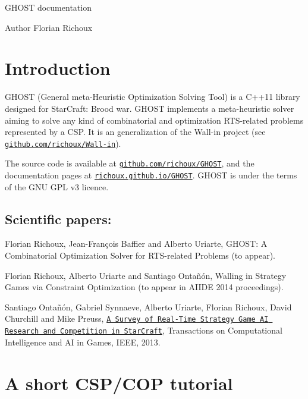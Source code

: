 G\-H\-O\-S\-T documentation \begin{DoxyAuthor}{Author}
Florian Richoux
\end{DoxyAuthor}
\section*{Introduction }

G\-H\-O\-S\-T (General meta-\/\-Heuristic Optimization Solving Tool) is a C++11 library designed for Star\-Craft\-: Brood war. G\-H\-O\-S\-T implements a meta-\/heuristic solver aiming to solve any kind of combinatorial and optimization R\-T\-S-\/related problems represented by a C\-S\-P. It is an generalization of the Wall-\/in project (see \href{https://github.com/richoux/Wall-in}{\tt github.\-com/richoux/\-Wall-\/in}).

The source code is available at \href{https://github.com/richoux/GHOST}{\tt github.\-com/richoux/\-G\-H\-O\-S\-T}, and the documentation pages at \href{http://richoux.github.io/GHOST}{\tt richoux.\-github.\-io/\-G\-H\-O\-S\-T}. G\-H\-O\-S\-T is under the terms of the G\-N\-U G\-P\-L v3 licence.

\subsection*{Scientific papers\-: }


\begin{DoxyItemize}
\item Florian Richoux, Jean-\/\-François Baffier and Alberto Uriarte, G\-H\-O\-S\-T\-: A Combinatorial Optimization Solver for R\-T\-S-\/related Problems (to appear).
\item Florian Richoux, Alberto Uriarte and Santiago Ontañón, Walling in Strategy Games via Constraint Optimization (to appear in A\-I\-I\-D\-E 2014 proceedings).
\item Santiago Ontañón, Gabriel Synnaeve, Alberto Uriarte, Florian Richoux, David Churchill and Mike Preuss, \href{http://pagesperso.lina.univ-nantes.fr/~richoux-f/publications/tciaig13.pdf}{\tt A Survey of Real-\/\-Time Strategy Game A\-I Research and Competition in Star\-Craft}, Transactions on Computational Intelligence and A\-I in Games, I\-E\-E\-E, 2013.
\end{DoxyItemize}

\section*{A short C\-S\-P/\-C\-O\-P tutorial }

